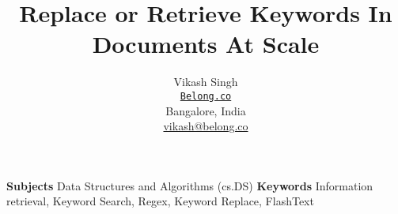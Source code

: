 \documentclass{article}
\title{Replace or Retrieve Keywords In Documents At Scale}
\author{
  Vikash Singh\vspace{-1ex}\\
  \texttt{\href{https://belong.co/}{Belong.co}}\\
  Bangalore, India\\
  \href{mailto:vikash@belong.co}{vikash@belong.co} 
}
\date{}
\begin{document}
\maketitle


\noindent\textbf{Subjects} Data Structures and Algorithms (cs.DS)\hfill\break
\newline
\noindent\textbf{Keywords} Information retrieval, Keyword Search, Regex, Keyword Replace, FlashText\hfill\break




%

\nocite{*}
\printbibliography
\end{document}
